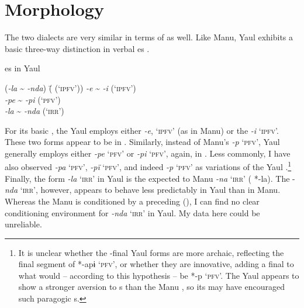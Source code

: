 \section{\label{sec:18.4}  Morphology}



The two dialects are very similar in terms of  as well. Like Manu, Yaul exhibits a basic three-way  distinction in verbal es .

\ea%
    \label{ex:mdy:2}
                 es in Yaul
\begin{tabbing}
{(\textit{-la} {\textasciitilde} \textit{-nda})} \= {( (‘\textsc{ipfv}’))}\kill
{\textit{-e} {\textasciitilde} \textit{-i}} \> { (‘\textsc{ipfv}’)}\\
{\textit{-pe} {\textasciitilde} \textit{-pi}} \> { (‘\textsc{pfv}’)}\\
{\textit{-la} {\textasciitilde} \textit{-nda}} \> { (‘\textsc{irr}’)}
\end{tabbing}
\z

For its basic  , the Yaul  employs either \textit{-e}, ‘\textsc{ipfv}’ (as in Manu) or the  \textit{-i} ‘\textsc{ipfv}’. These two forms appear to be in . Similarly, instead of Manu’s   \textit{-p} ‘\textsc{pfv}’, Yaul generally employs either \textit{-pe} ‘\textsc{pfv}’ or \textit{-pi} ‘\textsc{pfv}’, again, in . Less commonly, I have also observed \textit{-pa} ‘\textsc{pfv}’, \textit{-pï} ‘\textsc{pfv}’, and indeed \textit{-p} ‘\textsc{pfv}’ as variations of the Yaul  .\footnote{It is unclear whether the -final Yaul forms are more archaic, reflecting the final  segment of  *-apɨ ‘\textsc{pfv}’, or whether they are innovative, adding a final  to what would -- according to this hypothesis -- be  *-p ‘\textsc{pfv}’. The Yaul  appears to show a stronger aversion to s than the Manu , so its  may have encouraged such  paragogic s.} Finally, the  form \textit{-la} ‘\textsc{irr}’ in Yaul is the expected  to Manu \textit{-na} ‘\textsc{irr}’ ( *-la). The  \nobreakdash-\textit{nda} ‘\textsc{irr’}, however, appears to behave less predictably in Yaul than in Manu. Whereas the Manu  is conditioned by a preceding   (), I can find no clear conditioning environment for \textit{-nda} ‘\textsc{irr’} in Yaul. My data here could be unreliable.

